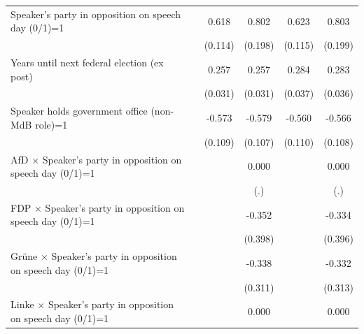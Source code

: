 \begin{table}[htbp]
\begin{tabular}{l*{5}{c}}
\addlinespace
Speaker's party in opposition on speech day (0/1)=1&                     &       0.618\sym{***}&       0.802\sym{***}&       0.623\sym{***}&       0.803\sym{***}\\
                    &                     &     (0.114)         &     (0.198)         &     (0.115)         &     (0.199)         \\
\addlinespace
Years until next federal election (ex post)&                     &       0.257\sym{***}&       0.257\sym{***}&       0.284\sym{***}&       0.283\sym{***}\\
                    &                     &     (0.031)         &     (0.031)         &     (0.037)         &     (0.036)         \\
\addlinespace
Speaker holds government office (non-MdB role)=1&                     &      -0.573\sym{***}&      -0.579\sym{***}&      -0.560\sym{***}&      -0.566\sym{***}\\
                    &                     &     (0.109)         &     (0.107)         &     (0.110)         &     (0.108)         \\
\addlinespace
AfD $\times$ Speaker's party in opposition on speech day (0/1)=1&                     &                     &       0.000         &                     &       0.000         \\
                    &                     &                     &         (.)         &                     &         (.)         \\
\addlinespace
FDP $\times$ Speaker's party in opposition on speech day (0/1)=1&                     &                     &      -0.352         &                     &      -0.334         \\
                    &                     &                     &     (0.398)         &                     &     (0.396)         \\
\addlinespace
Grüne $\times$ Speaker's party in opposition on speech day (0/1)=1&                     &                     &      -0.338         &                     &      -0.332         \\
                    &                     &                     &     (0.311)         &                     &     (0.313)         \\
\addlinespace
Linke $\times$ Speaker's party in opposition on speech day (0/1)=1&                     &                     &       0.000         &                     &       0.000         \\

\end{tabular}
\end{table}
